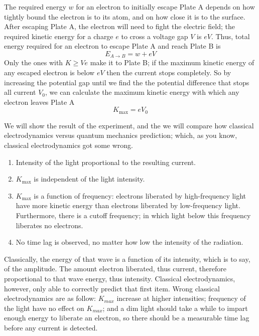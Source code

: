 \documentclass[../main.tex]{subfiles}
\begin{document}
The required energy $w$ for an electron to initially escape Plate A depends on how tightly bound the electron is to its atom, and on how close it is to the surface. After escaping Plate A, the electron will need to fight the electric field; the required kinetic energy for a charge $e$ to cross a voltage gap $V$ is $eV$. Thus, total energy required for an electron to escape Plate A and reach Plate B is 
\begin{equation*}
    E_{A\rightarrow B}=w+eV
\end{equation*}
Only the ones with $K \geq Ve$ make it to Plate B; if the maximum kinetic energy of any escaped electron
is below $eV$ then the current stops completely. So by increasing the potential gap until we find the the potential difference that stops all current $V_0$, we can calculate the maximum kinetic energy with which any electron leaves Plate A
\begin{equation*}
    K_{\text{max}}=eV_0
\end{equation*}

We will show the result of the experiment, and the we will compare how classical electrodynamics versus quantum mechanics prediction; which, as you know, classical electrodynamics got some wrong.
\begin{enumerate}
    \item Intensity of the light proportional to the resulting current.
    \item $K_{\text{max}}$ is independent of the light intensity.
    \item $K_{\text{max}}$ is a function of frequency: electrons liberated by high-frequency light have more kinetic energy than electrons liberated by low-frequency light. Furthermore, there is a cutoff frequency; in which light below this frequency liberates no electrons.
    \item No time lag is observed, no matter how low the intensity of the radiation. 
\end{enumerate}

Classically, the energy of that wave is a function of its intensity, which is to say, of the amplitude. The amount electron liberated, thus current, therefore proportional to that wave energy, thus intensity. Classical electrodynamics, however, only able to correctly predict that first item. Wrong classical electrodynamics are as follow: $K_{max}$ increase at higher intensities; frequency of the light have no effect on $K_{max}$; and a dim light should take a while to impart enough energy to liberate an electron, so there should be a measurable time lag before any current is detected.
\end{document}
